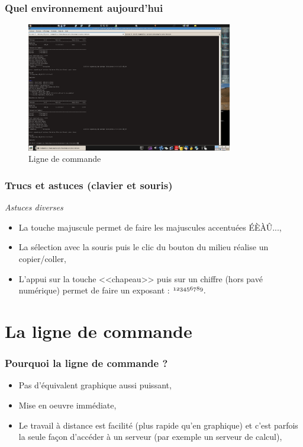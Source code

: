 \documentclass[handout,10pt]{beamer}
\begin{document}
\frame
{
    \frametitle{Quel environnement aujourd'hui}

     \begin{center}

        \begin{figure}
            \includegraphics[width=9cm]{images/ligne_commande.png}
            \caption{Ligne de commande}
        \end{figure}

    \end{center}
}


\frame
{
    \frametitle{Trucs et astuces (clavier et souris)}

    \begin{exampleblock}{\textit{Astuces diverses}}
        \begin{itemize}
            \item La touche majuscule permet de faire les majuscules accentuées ÉÈÀÛ...,
            \item La sélection avec la souris puis le clic du bouton du milieu réalise un copier/coller,
            \item L'appui sur la touche <<chapeau>> puis sur un chiffre (hors pavé numérique) permet de faire un exposant : $ \mathnormal{^{123456789}}. $
        \end{itemize}
    \end{exampleblock}
}


\section{La ligne de commande}
\frame
{
    \frametitle{Pourquoi la ligne de commande ?}

    \begin{itemize}
        \item Pas d'équivalent graphique aussi puissant,
        \item Mise en oeuvre immédiate,
        \item Le travail à distance est facilité (plus rapide qu'en graphique) et
              c'est parfois la seule façon d'accéder à un serveur (par exemple un
              serveur de calcul),
    \end{itemize}
}
\end{document}
